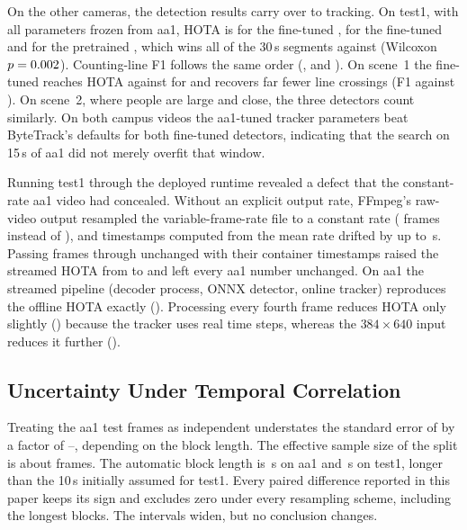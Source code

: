 On the other cameras, the detection results carry over to tracking. On test1, with all parameters frozen from aa1,
HOTA is \HoBtHotaYoloFtTun{} for the fine-tuned \yolo{}, \HoBtHotaRfFtTun{} for the fine-tuned \rfdetr{} and
\HoBtHotaYoloPtTun{} for the pretrained \yolo{}, which wins all \HoSegs{} of the 30\,s segments against \rfdetr{}
(Wilcoxon $p=0.002$). Counting-line F1 follows the same order (\HoAnCrossFoneYoloFt, \HoAnCrossFoneRfFt{} and
\HoAnCrossFoneYoloPt). On scene~1 the fine-tuned \yolo{} reaches HOTA \StVoneFtHota{} against \StVoneRfFtHota{} for
\rfdetr{} and recovers far fewer line crossings (F1 \StVoneFtCrossFone{} against \StVoneRfFtCrossFone). On scene~2,
where people are large and close, the three detectors count similarly. On both campus videos the aa1-tuned tracker
parameters beat ByteTrack's defaults for both fine-tuned detectors, indicating that the search on 15\,s of aa1 did not
merely overfit that window.

Running test1 through the deployed runtime revealed a defect that the constant-rate aa1 video had concealed. Without an
explicit output rate, FFmpeg's raw-video output resampled the variable-frame-rate file to a constant rate
(\HoVfrDelivered{} frames instead of \HoVfrFrames), and timestamps computed from the mean rate drifted by up to
\HoVfrTsErr\,s. Passing frames through unchanged with their container timestamps raised the streamed HOTA from
\HoVfrHotaBefore{} to \HoEdHotaHiSOne{} and left every aa1 number unchanged. On aa1 the streamed pipeline (decoder
process, ONNX detector, online tracker) reproduces the offline HOTA exactly (\EdHotaHiSOne). Processing every fourth
frame reduces HOTA only slightly (\EdHotaHiSFour) because the tracker uses real time steps, whereas the
$384{\times}640$ input reduces it further (\EdHotaLoSFour).

\subsection{Uncertainty Under Temporal Correlation}
\label{sec:stats}
Treating the \TcAaFrames{} aa1 test frames as independent understates the standard error of \AP{} by a factor of
\TcAaRatioMin--\TcAaRatioMax, depending on the block length. The effective sample size of the split is about
\TcAaNeff{} frames. The automatic block length is \TcAaAutoBlockS\,s on aa1 and \TcHoAutoBlockS\,s on
test1, longer than the 10\,s initially assumed for test1. Every paired difference reported in this paper keeps its sign
and excludes zero under every resampling scheme, including the longest blocks. The intervals widen, but no
conclusion changes.

